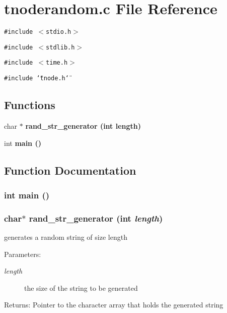 \section{tnoderandom.c File Reference}
\label{tnoderandom_8c}
{\tt \#include $<$stdio.h$>$}\par
{\tt \#include $<$stdlib.h$>$}\par
{\tt \#include $<$time.h$>$}\par
{\tt \#include \char`\"{}tnode.h\char`\"{}}\par
\subsection*{Functions}
\begin{CompactItemize}
\item 
char $\ast$ \bf{rand\_\-str\_\-generator} (int length)
\item 
int \bf{main} ()
\end{CompactItemize}


\subsection{Function Documentation}
\subsubsection{\setlength{\rightskip}{0pt plus 5cm}int main ()}\label{tnoderandom_8c_e66f6b31b5ad750f1fe042a706a4e3d4}


\subsubsection{\setlength{\rightskip}{0pt plus 5cm}char$\ast$ rand\_\-str\_\-generator (int {\em length})}\label{tnoderandom_8c_823f9b82f39f1589534e5771a1e50e11}


generates a random string of size length \begin{Desc}
\item[Parameters:]
\begin{description}
\item[{\em length}]the size of the string to be generated \end{description}
\end{Desc}
\begin{Desc}
\item[Returns:]Pointer to the character array that holds the generated string \end{Desc}
